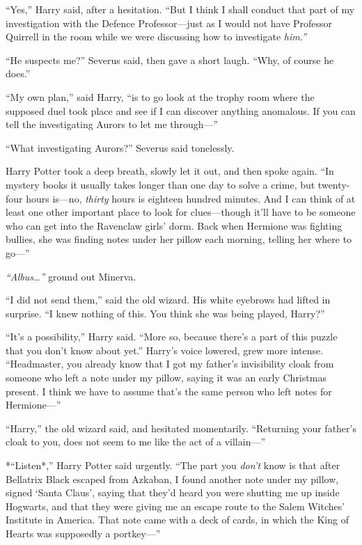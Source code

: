 ``Yes,'' Harry said, after a hesitation. ``But I think I shall conduct
that part of my investigation with the Defence Professor---just as I
would not have Professor Quirrell in the room while we were discussing
how to investigate \emph{him.''}

``He suspects me?'' Severus said, then gave a short laugh. ``Why, of
course he does.''

``My own plan,'' said Harry, ``is to go look at the trophy room where
the supposed duel took place and see if I can discover anything
anomalous. If you can tell the investigating Aurors to let me
through---''

``What investigating Aurors?'' Severus said tonelessly.

Harry Potter took a deep breath, slowly let it out, and then spoke
again. ``In mystery books it usually takes longer than one day to solve
a crime, but twenty-four hours is---no, \emph{thirty} hours is eighteen
hundred minutes. And I can think of at least one other important place
to look for clues---though it'll have to be someone who can get into the
Ravenclaw girls' dorm. Back when Hermione was fighting bullies, she was
finding notes under her pillow each morning, telling her where to
go---''

\emph{``Albus\ldots{}''} ground out Minerva.

``I did not send them,'' said the old wizard. His white eyebrows had
lifted in surprise. ``I knew nothing of this. You think she was being
played, Harry?''

``It's a possibility,'' Harry said. ``More so, because there's a part of
this puzzle that you don't know about yet.'' Harry's voice lowered, grew
more intense. ``Headmaster, you already know that I got my father's
invisibility cloak from someone who left a note under my pillow, saying
it was an early Christmas present. I think we have to assume that's the
same person who left notes for Hermione---''

``Harry,'' the old wizard said, and hesitated momentarily. ``Returning
your father's cloak to you, does not seem to me like the act of a
villain---''

*``Listen*,'' Harry Potter said urgently. ``The part you \emph{don't}
know is that after Bellatrix Black escaped from Azkaban, I found another
note under my pillow, signed `Santa Claus', saying that they'd heard you
were shutting me up inside Hogwarts, and that they were giving me an
escape route to the Salem Witches' Institute in America. That note came
with a deck of cards, in which the King of Hearts was supposedly a
portkey---''

